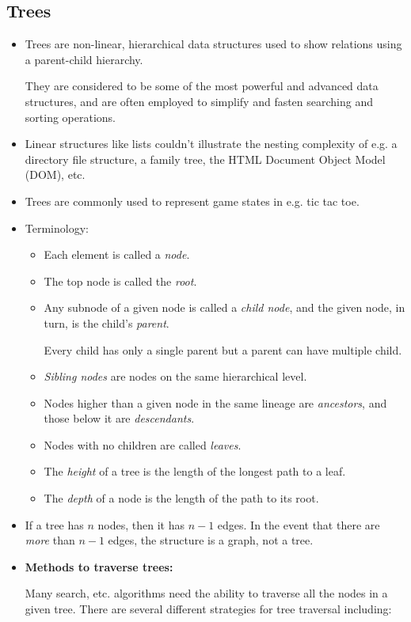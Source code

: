 \documentclass[12pt]{article}
\newcommand{\vsp}{\vspace{0.75mm}}
\begin{document}
	\subsection*{Trees}
	\begin{itemize}
		\item Trees are non-linear, hierarchical data structures used to show relations using a parent-child hierarchy.
		
		They are considered to be some of the most powerful and advanced data structures, and are often employed to simplify and fasten searching and sorting operations.
		\item Linear structures like lists couldn't illustrate the nesting complexity of e.g. a directory file structure, a family tree, the HTML Document Object Model (DOM), etc.
		\item Trees are commonly used to represent game states in e.g. tic tac toe.
		\item Terminology:
		\begin{itemize}
			\item Each element is called a \emph{node}.
			\item The top node is called the \emph{root}.
			\item Any subnode of a given node is called a \emph{child node}, and the given node, in turn, is the child's \emph{parent}.
			
			Every child has only a single parent but a parent can have multiple child.
			\item \emph{Sibling nodes} are nodes on the same hierarchical level.
			\item Nodes higher than a given node in the same lineage are \emph{ancestors}, and those below it are \emph{descendants}.
			\item Nodes with no children are called \emph{leaves}.
			\item The \emph{height} of a tree is the length of the longest path to a leaf.
			\item The \emph{depth} of a node is the length of the path to its root.
		\end{itemize}
		\item If a tree has $n$ nodes, then it has $n-1$ edges. In the event that there are \textit{more} than $n-1$ edges, the structure is a graph, not a tree.
		\item \textbf{Methods to traverse trees:}
		
		Many search, etc. algorithms need the ability to traverse all the nodes in a given tree. There are several different strategies for tree traversal including:\vsp
			

\end{itemize}
\end{document}

